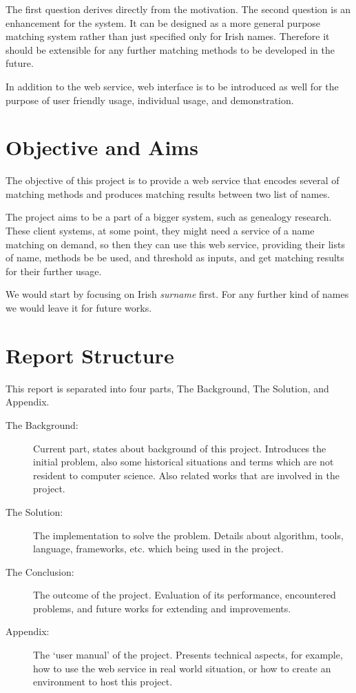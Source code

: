 The first question derives directly from the motivation.
The second question is an enhancement for the system. It can be designed
as a more general purpose matching system rather than just specified
only for Irish names. Therefore it should be extensible for any further
matching methods to be developed in the future.

In addition to the web service, web interface is to be introduced as well
for the purpose of user friendly usage, individual usage, and demonstration.

\section{Objective and Aims}

The objective of this project is to provide a web service that
encodes several of matching methods and produces matching
results between two list of names.

The project aims to be a part of a bigger system, such as
genealogy research. These client systems, at some point,
they might need a service of a name matching on demand, so then they can use this
web service, providing their lists of name, methods be be used,
and threshold as inputs, and get matching results for their further usage.

We would start by focusing on Irish \textit{surname} first.
For any further kind of names we would leave it for future works.

\section{Report Structure}

This report is separated into four parts, The Background, The Solution,
and Appendix.

\begin{description}
\item[The Background:]
  Current part, states about background of this project. Introduces
  the initial problem, also some historical situations and terms
  which are not resident to computer science. Also related works
  that are involved in the project.
\item[The Solution:]
  The implementation to solve the problem. Details about algorithm,
  tools, language, frameworks, etc. which being used in the project.
\item[The Conclusion:]
  The outcome of the project. Evaluation of its performance,
  encountered problems, and future works for extending and improvements.
\item[Appendix:]
  The `user manual' of the project. Presents technical aspects,
  for example, how to use the web service in real world situation,
  or how to create an environment to host this project.
\end{description}
